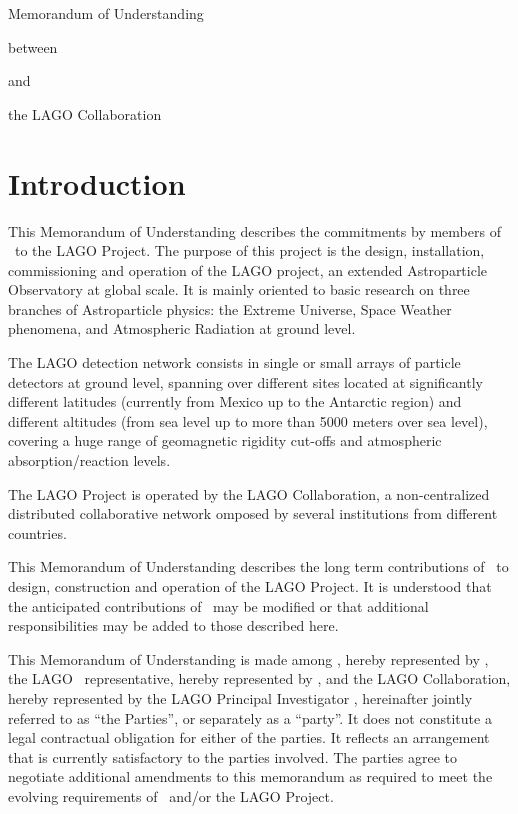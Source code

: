 {\bf
  {\LARGE
    \centerline{Memorandum of Understanding}
  }
  {\Large
    \centerline{between}
    \centerline{\institution}
    \centerline{and}
    \centerline{the LAGO Collaboration}
    \vspace*{0.2cm}
    \centerline{\datesignen}
  }
}

\section{Introduction}

This Memorandum of Understanding describes the commitments by members of
\institution~to the LAGO Project. The purpose of this project is the design,
installation, commissioning and operation of the LAGO project, an extended
Astroparticle Observatory at global scale.
It is mainly oriented to basic research on three branches of Astroparticle
physics: the Extreme Universe, Space Weather phenomena, and Atmospheric
Radiation at ground level.

The LAGO detection network consists in single or small arrays of particle
detectors at ground level, spanning over different sites located at
significantly different latitudes (currently from Mexico up to the Antarctic
region) and different altitudes (from sea level up to more than 5000 meters
over sea level), covering a huge range of geomagnetic rigidity cut-offs and
atmospheric absorption/reaction levels. 

The LAGO Project is operated by the LAGO Collaboration, a non-centralized
distributed collaborative network omposed by several institutions from
different countries.

This Memorandum of Understanding describes the long term contributions of
\institution~to design, construction and operation of the LAGO Project. It is
understood that the anticipated contributions of \institution~may be modified
or that additional responsibilities may be added to those described here. 

This Memorandum of Understanding is made among \institution, hereby
represented by \instrep, the LAGO \country~representative, hereby represented
by \countryrep, and the LAGO Collaboration, hereby represented by the LAGO
Principal Investigator \lagopi, hereinafter jointly referred to as ``the
Parties'', or separately as a ``party''. It does not constitute a legal
contractual obligation for either of the parties. It reflects an arrangement
that is currently satisfactory to the parties involved.  The parties agree to
negotiate additional amendments to this memorandum as required to meet the
evolving requirements of \institution~and/or the LAGO Project.

